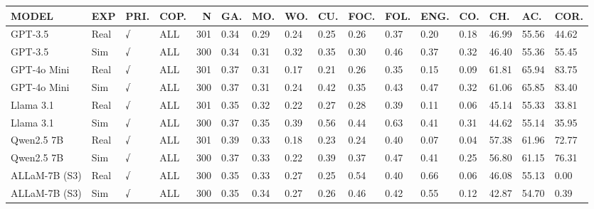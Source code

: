 \begin{tabular}{llllrlllllllllll}
\toprule
MODEL & EXP & PRI. & COP. & N & GA. & MO. & WO. & CU. & FOC. & FOL. & ENG. & CO. & CH. & AC. & COR. \\
\midrule
GPT-3.5 & Real & √ & ALL & 301 & 0.34 & 0.29 & 0.24 & 0.25 & 0.26 & 0.37 & 0.20 & 0.18 & 46.99 & 55.56 & 44.62 \\
GPT-3.5 & Sim & √ & ALL & 300 & 0.34 & 0.31 & 0.32 & 0.35 & 0.30 & 0.46 & 0.37 & 0.32 & 46.40 & 55.36 & 55.45 \\
GPT-4o Mini & Real & √ & ALL & 301 & 0.37 & 0.31 & 0.17 & 0.21 & 0.26 & 0.35 & 0.15 & 0.09 & 61.81 & 65.94 & 83.75 \\
GPT-4o Mini & Sim & √ & ALL & 300 & 0.37 & 0.31 & 0.24 & 0.42 & 0.35 & 0.43 & 0.47 & 0.32 & 61.06 & 65.85 & 83.40 \\
Llama 3.1 & Real & √ & ALL & 301 & 0.35 & 0.32 & 0.22 & 0.27 & 0.28 & 0.39 & 0.11 & 0.06 & 45.14 & 55.33 & 33.81 \\
Llama 3.1 & Sim & √ & ALL & 300 & 0.37 & 0.35 & 0.39 & 0.56 & 0.44 & 0.63 & 0.41 & 0.31 & 44.62 & 55.14 & 35.95 \\
Qwen2.5 7B & Real & √ & ALL & 301 & 0.39 & 0.33 & 0.18 & 0.23 & 0.24 & 0.40 & 0.07 & 0.04 & 57.38 & 61.96 & 72.77 \\
Qwen2.5 7B & Sim & √ & ALL & 300 & 0.37 & 0.33 & 0.22 & 0.39 & 0.37 & 0.47 & 0.41 & 0.25 & 56.80 & 61.15 & 76.31 \\
ALLaM-7B (S3) & Real & √ & ALL & 300 & 0.35 & 0.33 & 0.27 & 0.25 & 0.54 & 0.40 & 0.66 & 0.06 & 46.08 & 55.13 & 0.00 \\
ALLaM-7B (S3) & Sim & √ & ALL & 300 & 0.35 & 0.34 & 0.27 & 0.26 & 0.46 & 0.42 & 0.55 & 0.12 & 42.87 & 54.70 & 0.39 \\
\bottomrule
\end{tabular}
